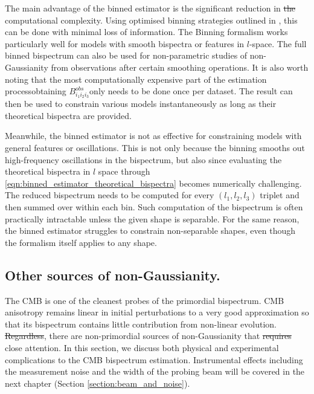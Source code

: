 \documentclass[a4paper,12pt,times,custombib,print,index]{Classes/PhDThesisPSnPDF} %
\providecommand{\DIFadd}[1]{{\protect\color{blue}\uwave{#1}}} %
\providecommand{\DIFdel}[1]{{\protect\color{red}\sout{#1}}}                      %
\providecommand{\DIFaddbegin}{} %
\providecommand{\DIFaddend}{} %
\providecommand{\DIFdelbegin}{} %
\providecommand{\DIFdelend}{} %
\newcommand{\DIFscaledelfig}{0.5}
\newlength{\DIFdelgraphicswidth} %
\newlength{\DIFdelgraphicsheight} %
\newcommand{\DIFaddincludegraphics}[2][]{{\color{blue}\fbox{\DIFOincludegraphics[#1]{#2}}}} %
\newcommand{\DIFdelincludegraphics}[2][]{%
\sbox{\DIFdelgraphicsbox}{\DIFOincludegraphics[#1]{#2}}%
\settoboxwidth{\DIFdelgraphicswidth}{\DIFdelgraphicsbox} %
\settoboxtotalheight{\DIFdelgraphicsheight}{\DIFdelgraphicsbox} %
\scalebox{\DIFscaledelfig}{%
\parbox[b]{\DIFdelgraphicswidth}{\usebox{\DIFdelgraphicsbox}\\[-\baselineskip] \rule{\DIFdelgraphicswidth}{0em}}\llap{\resizebox{\DIFdelgraphicswidth}{\DIFdelgraphicsheight}{%
\setlength{\unitlength}{\DIFdelgraphicswidth}%
\begin{picture}(1,1)%
\thicklines\linethickness{2pt} %
{\color[rgb]{1,0,0}\put(0,0){\framebox(1,1){}}}%
{\color[rgb]{1,0,0}\put(0,0){\line( 1,1){1}}}%
{\color[rgb]{1,0,0}\put(0,1){\line(1,-1){1}}}%
\end{picture}%
}\hspace*{3pt}}} %
} %
\DeclareRobustCommand{\DIFaddbegin}{\DIFOaddbegin \let\includegraphics\DIFaddincludegraphics} %
\DeclareRobustCommand{\DIFaddend}{\DIFOaddend \let\includegraphics\DIFOincludegraphics} %
\DeclareRobustCommand{\DIFdelbegin}{\DIFOdelbegin \let\includegraphics\DIFdelincludegraphics} %
\DeclareRobustCommand{\DIFdelend}{\DIFOaddend \let\includegraphics\DIFOincludegraphics} %
\begin{document}
The main advantage of the binned estimator is the significant reduction in \DIFdelbegin \DIFdel{the }\DIFdelend computational complexity. Using optimised binning strategies outlined in \cite{Bucher2016}, this can be done with minimal loss of information. The Binning formalism works particularly well for models with smooth bispectra or features in $l$-space. The full binned bispectrum can also be used for non-parametric studies of non-Gaussianity from observations after certain smoothing operations. It is also worth noting that the most computationally expensive part of the estimation process\textemdash obtaining \DIFdelbegin \DIFdel{$B^{obs}_{i_1 i_2 i_3}$}\DIFdelend \DIFaddbegin \DIFadd{$B^\text{obs}_{i_1 i_2 i_3}$}\DIFaddend \textemdash only needs to be done once per dataset. The result can then be used to constrain various models instantaneously as long as their theoretical bispectra are provided.

Meanwhile, the binned estimator is not as effective for constraining models with general features or oscillations. This is not only because the binning smooths out high-frequency oscillations in the bispectrum, but also since evaluating the theoretical bispectra in $l$ space through \eqref{eqn:binned_estimator_theoretical_bispectra} becomes numerically challenging. The reduced bispectrum needs to be computed for every $(l_1,l_2,l_3)$ triplet and then summed over within each bin. Such computation of the bispectrum is often practically intractable unless the given shape is separable. For the same reason, the binned estimator struggles to constrain non-separable shapes, even though the formalism itself applies to any shape.


\subsection{Other sources of non-Gaussianity.} \label{section:other_sources_of_non_gaussianity}

The CMB is one of the cleanest probes of the primordial bispectrum. CMB anisotropy remains linear in initial perturbations to a very good approximation so that its bispectrum contains \DIFaddbegin \DIFadd{a }\DIFaddend little contribution from non-linear evolution. \DIFdelbegin \DIFdel{Regardless}\DIFdelend \DIFaddbegin \DIFadd{Nevertheless}\DIFaddend , there are non-primordial sources of non-Gaussianity that \DIFdelbegin \DIFdel{requires }\DIFdelend \DIFaddbegin \DIFadd{require }\DIFaddend close attention. In this section, we discuss both physical and experimental complications to the CMB bispectrum estimation. Instrumental effects including the measurement noise and the width of the probing beam will be covered in the next chapter (Section \ref{section:beam_and_noise}).
\end{document}
